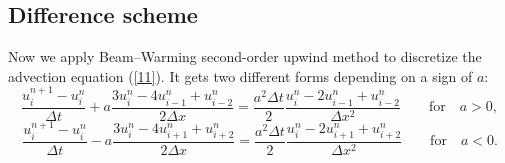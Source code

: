 \documentclass[a4paper, 10pt]{article}
\begin{document}
\subsection{Difference scheme}
Now we apply Beam--Warming second-order upwind method to discretize the advection equation (\ref{11}). It gets two different forms depending on a sign of $ a $:
\begin{equation}
\label{12}
\frac{u_i^{n+1} - u_i^n}{\Delta t} + a\frac{3u_i^n - 4u_{i-1}^n + u_{i-2}^n}{2 \Delta x} = \frac{a^2 \Delta t}{2} \frac{u_{i}^n - 2u_{i-1}^n + u_{i-2}^n}{\Delta x^2} \qquad \mathrm{for} \quad a > 0,
\end{equation}
\begin{equation}
\label{13}
\frac{u_i^{n+1} - u_i^n}{\Delta t} - a\frac{3u_i^n - 4u_{i+1}^n + u_{i+2}^n}{2 \Delta x} = \frac{a^2 \Delta t}{2} \frac{u_{i}^n - 2u_{i+1}^n + u_{i+2}^n}{\Delta x^2} \qquad \mathrm{for} \quad a < 0.
\end{equation}
\end{document}
